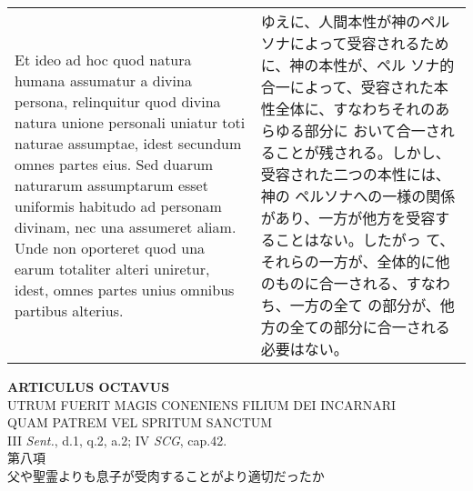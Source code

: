 \documentclass[10pt]{jsarticle} %
\begin{document}
\begin{longtable}{p{21em}p{21em}}
\\

Et ideo ad hoc quod natura humana assumatur a divina
persona, relinquitur quod divina natura unione personali uniatur toti
naturae assumptae, idest secundum omnes partes eius. Sed duarum
naturarum assumptarum esset uniformis habitudo ad personam divinam, nec
una assumeret aliam.
Unde non oporteret quod una earum totaliter alteri
uniretur, idest, omnes partes unius omnibus partibus alterius.


&


ゆえに、人間本性が神のペルソナによって受容されるために、神の本性が、ペル
 ソナ的合一によって、受容された本性全体に、すなわちそれのあらゆる部分に
 おいて合一されることが残される。しかし、受容された二つの本性には、神の
 ペルソナへの一様の関係があり、一方が他方を受容することはない。したがっ
 て、それらの一方が、全体的に他のものに合一される、すなわち、一方の全て
 の部分が、他方の全ての部分に合一される必要はない。





\end{longtable}
\newpage



\begin{center}
 {\Large {\bf ARTICULUS OCTAVUS}}\\
 {\large UTRUM FUERIT MAGIS CONENIENS FILIUM DEI INCARNARI\\QUAM PATREM
 VEL SPRITUM SANCTUM}\\
 {\footnotesize III {\itshape Sent.}, d.1, q.2, a.2; IV {\itshape SCG}, cap.42.}\\
 {\Large 第八項\\父や聖霊よりも息子が受肉することがより適切だったか}
\end{center}
\end{document}
